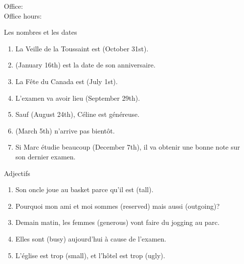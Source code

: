 \documentclass{beamer}
\subtitle[Révision: Examen 1]{La révision pour l'examen 1}
\begin{document}
  \begin{frame}
    \titlepage
    \tiny{Office: \\
          Office hours: }
  \end{frame}

  \begin{frame}{Les nombres et les dates }
    \begin{enumerate}
      \item La Veille de la Toussaint est \underline{} (October 31st).
      \item \underline{} (January 16th) est la date de son anniversaire.
      \item La Fête du Canada est \underline{} (July 1st).
      \item L'examen va avoir lieu \underline{} (September 29th).
      \item Sauf \underline{} (August 24th), Céline est généreuse.
      \item \underline{} (March 5th) n'arrive pas bientôt.
      \item Si Marc étudie beaucoup \underline{} (December 7th), il va obtenir une bonne note sur son dernier examen.
    \end{enumerate}
  \end{frame}

  \begin{frame}{Adjectifs }
    \begin{enumerate}
      \item Son oncle joue au basket parce qu'il est \underline{} (tall).
      \item Pourquoi mon ami et moi sommes \underline{} (reserved) mais aussi \underline{} (outgoing)?
      \item Demain matin, les femmes \underline{} (generous) vont faire du jogging au parc.
      \item Elles sont \underline{} (busy) aujourd'hui à cause de l'examen.
      \item L'église est trop \underline{} (small), et l'hôtel est trop \underline{} (ugly).
    \end{enumerate}
  \end{frame}
\end{document}
